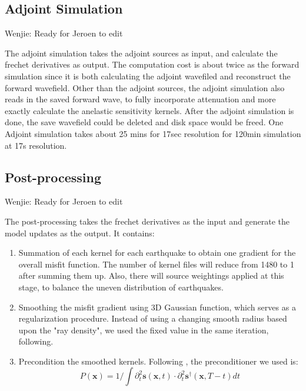 \documentclass[extra,mreferee]{gji}
\begin{document}
\subsection{Adjoint Simulation}

{\color{Red} Wenjie: Ready for Jeroen to edit}

The adjoint simulation takes the adjoint sources as input, and calculate the frechet
derivatives as output. The computation cost is about twice as the forward simulation since
it is both calculating the adjoint wavefiled and reconstruct the forward wavefield.
Other than the adjoint sources, the adjoint simulation also reads in the saved forward
wave, to fully incorporate attenuation and more exactly calculate the anelastic
sensitivity kernels.
After the adjoint simulation is done, the save wavefield could be deleted and disk
space would be freed.
One Adjoint simulation takes about 25 mins for 17sec resolution for 120min simulation
at 17s resolution.

\subsection{Post-processing}

{\color{Red} Wenjie: Ready for Jeroen to edit}

The post-processing takes the frechet derivatives as the input and generate
the model updates as the output. It contains:
\begin{enumerate}
  \item Summation of each kernel for each earthquake to obtain one
    gradient for the overall misfit function. The number of kernel
    files will reduce from 1480 to 1 after summing them up. Also,
    there will source weightings applied at this stage, to balance
    the uneven distribution of earthquakes.
  \item Smoothing the misfit gradient using 3D Gaussian function, which
    serves as a regularization procedure. Instead of using a changing
    smooth radius based upon the "ray density"\citep{bozdaug2016global},
    we used the fixed value in the same iteration, following\cite{zhu2012structure}.
  \item Precondition the smoothed kernels. Following
    \citep{luo2013strategies, zhu2012structure, bozdaug2016global},
    the preconditioner we used is:
    \begin{equation}
      P(\mathbf{x}) = 1 / \int \partial_t^2 \mathbf{s}(\mathbf{x}, t) \cdot \partial_t^2 \mathbf{s}^\dagger(\mathbf{x}, T-t) dt
    \end{equation}
\end{enumerate}
\end{document}
